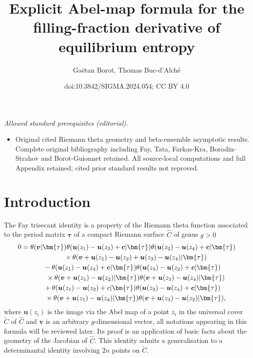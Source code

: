 \documentclass[10pt,a4paper]{amsart}
\title{Explicit Abel-map formula for the filling-fraction derivative of equilibrium entropy}
\author{Gaëtan Borot, Thomas Buc-d'Alché}
\date{doi:10.3842/SIGMA.2024.054; CC BY 4.0}
\numberwithin{equation}{section}
\begin{document}
\maketitle
\noindent\textit{Allowed standard prerequisites (editorial).}\begin{itemize}
\item Original cited Riemann theta geometry and beta-ensemble asymptotic results. Complete original bibliography including Fay, Tata, Farkas-Kra, Borodin-Strahov and Borot-Guionnet retained. All source-local computations and full Appendix retained; cited prior standard results not reproved.
\end{itemize}\medskip
\section{Introduction}

The Fay trisecant identity \cite{Fay} is a property of the Riemann theta function associated to the period matrix $\bm{\tau}$ of a compact Riemann surface $\widehat{C}$ of genus $g > 0$
\begin{gather}
0 = \theta(\boldsymbol{v}|\bm{\tau}) \theta (\boldsymbol{u}(z_1) - \boldsymbol{u}(z_3) + \boldsymbol{c} |\bm{\tau} )\theta (\boldsymbol{u}(z_2) - \boldsymbol{u}(z_4) + \boldsymbol{c} |\bm{\tau} ) \nonumber\\
\hphantom{0=}\quad{}
\times \theta (\boldsymbol{v} + \boldsymbol{u}(z_1) - \boldsymbol{u}(z_2) + \boldsymbol{u}(z_3) - \boldsymbol{u}(z_4) |\bm{\tau} ) \nonumber\\
\hphantom{0=}{} - \theta(\boldsymbol{u}(z_1) - \boldsymbol{u}(z_4) + \boldsymbol{c} |\bm{\tau} )\theta (\boldsymbol{u}(z_3) - \boldsymbol{u}(z_2) + \boldsymbol{c} |\bm{\tau} )\nonumber\\
\hphantom{0=}\quad {}\times\theta (\boldsymbol{v} + \boldsymbol{u}(z_1) - \boldsymbol{u}(z_2) |\bm{\tau} )\theta (\boldsymbol{v} + \boldsymbol{u}(z_3) - \boldsymbol{u}(z_4) |\bm{\tau} ) \nonumber\\
\hphantom{0=}{}+ \theta (\boldsymbol{u}(z_1) - \boldsymbol{u}(z_2) + c |\bm{\tau} )\theta (\boldsymbol{u}(z_3) - \boldsymbol{u}(z_4) + \boldsymbol{c} |\bm{\tau} ) \nonumber\\
\hphantom{0=}\quad {}\times \theta (\boldsymbol{v} + \boldsymbol{u}(z_1) - \boldsymbol{u}(z_4) |\bm{\tau} )\theta (\boldsymbol{v} + \boldsymbol{u}(z_3) - \boldsymbol{u}(z_2) |\bm{\tau} ) ,\label{Fayid}
\end{gather}
where $\boldsymbol{u}(z_i)$ is the image via the Abel map of a point $z_i$ in the universal cover $\widetilde{C}$ of $\widehat{C}$ and $\boldsymbol{v}$ is an arbitrary $g$-dimensional vector, all notations appearing in this formula will be reviewed later. Its proof is an application of basic facts about the geometry of the Jacobian of $\widehat{C}$. This identity admits a generalisation to a determinantal identity involving $2n$ points on $\widetilde{C}$.
\end{document}
